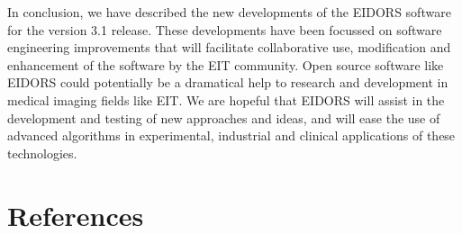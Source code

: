 \documentclass[12pt]{iopart}
\begin{document}
In conclusion, we have described the new
developments of the EIDORS software for the
version 3.1 release. These developments have been 
focussed on software engineering improvements that
will facilitate collaborative use, modification and
enhancement of the software by the EIT community.
Open source software like EIDORS could
potentially be a dramatical help to
research and development in medical imaging fields like EIT.
We are hopeful that EIDORS will assist in the development
and testing of new approaches and ideas, and will
ease the use of advanced algorithms in experimental,
industrial and clinical applications of these technologies.


\section*{References}
\end{document}
